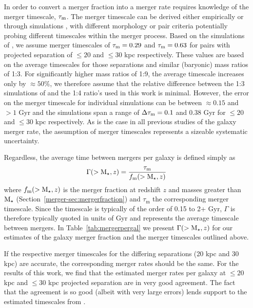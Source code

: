 In order to convert a merger fraction into a merger rate requires knowledge of the merger timescale, $\tau_{\rm{m}}$. The merger timescale can be derived either empirically \citep{Conselice:2009bi} or through simulations \citep{Kitzbichler:2008gi,Lotz:2010ie,Lotz:2010hf}, with different morphology or pair criteria potentially probing different timescales within the merger process. Based on the simulations of \citet{Lotz:2010ie}, we assume merger timescales of $\tau_{\rm{m}} = 0.29$ and $\tau_{\rm{m}} = 0.63$ for pairs with projected separation of $\leq 20$ and $\leq 30$ kpc respectively. These values are based on the average timescales for those separations and similar (baryonic) mass ratios of 1:3. For significantly higher mass ratios of 1:9, the average timescale increases only by $\approx 50\%$, we therefore assume that the relative difference between the 1:3 simulations of \citet{Lotz:2010ie} and the 1:4 ratio's used in this work is minimal. However, the error on the merger timescale for individual simulations can be between $\approx 0.15$ and $>1$ Gyr and the simulations span a range of $\Delta\tau_{\rm{m}} = 0.1$ and 0.38 Gyr for $\leq 20$ and $\leq 30$ kpc respectively. As is the case in all previous studies of the galaxy merger rate, the assumption of merger timescales represents a sizeable systematic uncertainty.

Regardless, the average time between mergers per galaxy is defined simply as
\begin{equation}
	\Gamma(>\text{M}_{\star}, z) = \frac{\tau_{\text{m}}}{f_{\text{m}}(>\text{M}_{\star}, z)}
\end{equation}
where $f_{\text{m}}(>\text{M}_{\star}, z)$ is the merger fraction at redshift $z$ and masses greater than $\text{M}_{\star}$ (Section~\ref{merger-sec:mergerfraction}) and $\tau_{\text{m}}$ the corresponding merger timescale. Since the timescale is typically of the order of 0.15 to 2+ Gyr, $\Gamma$ is therefore typically quoted in units of Gyr and represents the average timescale between mergers. In Table~\ref{tab:mergerpergal} we present $\Gamma(>\text{M}_{\star}, z)$ for our estimates of the galaxy merger fraction and the merger timescales outlined above.

If the respective merger timescales for the differing separations (20 kpc and 30 kpc) are accurate, the corresponding merger rates should be the same. For the results of this work, we find that the estimated merger rates per galaxy at $\leq 20$ kpc and $\leq 30$ kpc projected separation are in very good agreement. The fact that the agreement is so good (albeit with very large errors) lends support to the estimated timescales from \citet{Lotz:2010ie}.

